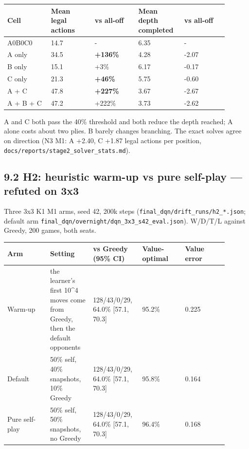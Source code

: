 \documentclass[11pt]{article}
\begin{document}
\begin{center}\scriptsize
\begin{longtable}{p{0.18\linewidth}p{0.18\linewidth}p{0.18\linewidth}p{0.18\linewidth}p{0.18\linewidth}}
\toprule
Cell & Mean legal actions & vs all-off & Mean depth completed & vs all-off \\
\midrule
A0B0C0 & 14.7 & - & 6.35 & - \\
A only & 34.5 & \textbf{+136\%} & 4.28 & -2.07 \\
B only & 15.1 & +3\% & 6.17 & -0.17 \\
C only & 21.3 & \textbf{+46\%} & 5.75 & -0.60 \\
A + C & 47.8 & \textbf{+227\%} & 3.67 & -2.67 \\
A + B + C & 47.2 & +222\% & 3.73 & -2.62 \\
\bottomrule
\end{longtable}
\end{center}

A and C both pass the 40\% threshold and both reduce the depth reached; A alone costs about two
plies. B barely changes branching. The exact solves agree on direction (N3 M1: A +2.40,
C +1.87 legal actions per position, \texttt{docs/reports/stage2\_solver\_stats.md}).

\subsection{9.2 H2: heuristic warm-up vs pure self-play — refuted on 3x3}

Three 3x3 K1 M1 arms, seed 42, 200k steps (\texttt{final\_dqn/drift\_runs/h2\_*.json}; default arm
\texttt{final\_dqn/overnight/dqn\_3x3\_s42\_eval.json}). W/D/T/L against Greedy, 200 games, both seats.

\begin{center}\scriptsize
\begin{longtable}{p{0.18\linewidth}p{0.18\linewidth}p{0.18\linewidth}p{0.18\linewidth}p{0.18\linewidth}}
\toprule
Arm & Setting & vs Greedy (95\% CI) & Value-optimal & Value error \\
\midrule
Warm-up & the learner's first 10\textasciicircum{}4 moves come from Greedy, then the default opponents & 128/43/0/29, 64.0\% [57.1, 70.3] & 95.2\% & 0.225 \\
Default & 50\% self, 40\% snapshots, 10\% Greedy & 128/43/0/29, 64.0\% [57.1, 70.3] & 95.8\% & 0.164 \\
Pure self-play & 50\% self, 50\% snapshots, no Greedy & 128/43/0/29, 64.0\% [57.1, 70.3] & 96.4\% & 0.168 \\
\bottomrule
\end{longtable}
\end{center}
\end{document}
